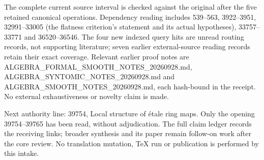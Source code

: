 The complete current source interval is checked against the original after the five retained canonical operations. Dependency reading includes 539--563, 3922--3951, 32991--33005 (the flatness criterion's statement and its actual hypotheses), 33757--33771 and 36520--36546. The four new indexed query hits are unread routing records, not supporting literature; seven earlier external-source reading records retain their exact coverage. Relevant earlier proof notes are ALGEBRA\_\allowbreak{}FORMAL\_\allowbreak{}SMOOTH\_\allowbreak{}NOTES\_\allowbreak{}20260928.\allowbreak{}md, ALGEBRA\_\allowbreak{}SYNTOMIC\_\allowbreak{}NOTES\_\allowbreak{}20260928.\allowbreak{}md and ALGEBRA\_\allowbreak{}SMOOTH\_\allowbreak{}NOTES\_\allowbreak{}20260928.\allowbreak{}md, each hash-bound in the receipt. No external exhaustiveness or novelty claim is made.

Next authority line: 39754, Local structure of étale ring maps. Only the opening 39754--39765 has been read, without adjudication. The full claim ledger records the receiving links; broader synthesis and its paper remain follow-on work after the core review. No translation mutation, TeX run or publication is performed by this intake.
